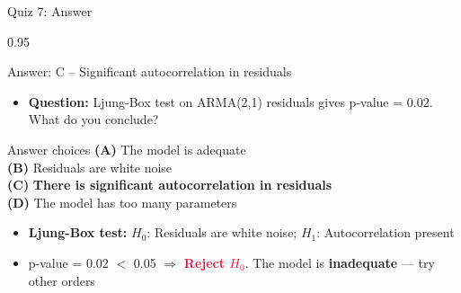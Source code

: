 \documentclass[9pt, aspectratio=169, t]{beamer}
\begin{document}
\begin{frame}{Quiz 7: Answer}
    \begin{cminipage}{0.95\textwidth}
    \begin{exampleblock}{Answer: C -- Significant autocorrelation in residuals}
        \begin{itemize}\setlength{\itemsep}{0pt}
            \item \textbf{Question:} Ljung-Box test on ARMA(2,1) residuals gives p-value = 0.02. What do you conclude?
        \end{itemize}

        \vspace{0.3cm}

    \begin{block}{Answer choices}
        \textcolor{MainBlue}{\textbf{(A)}} The model is adequate \incorrect\\[3pt]
        \textcolor{MainBlue}{\textbf{(B)}} Residuals are white noise \incorrect\\[3pt]
        \textcolor{MainBlue}{\textbf{(C)}} \textbf{\textcolor{Forest}{There is significant autocorrelation in residuals}} \correct\\[3pt]
        \textcolor{MainBlue}{\textbf{(D)}} The model has too many parameters \incorrect
    \end{block}

        \vspace{0.3cm}

        \begin{itemize}
            \item \textbf{Ljung-Box test:} $H_0$: Residuals are white noise; $H_1$: Autocorrelation present
            \item p-value = 0.02 $<$ 0.05 $\Rightarrow$ \textcolor{Crimson}{\textbf{Reject $H_0$}}. The model is \textbf{inadequate} --- try other orders
        \end{itemize}
    \end{exampleblock}

    \end{cminipage}
\end{frame}
\end{document}
